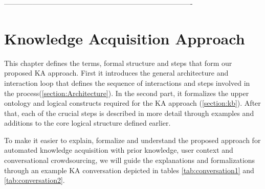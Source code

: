 -------------------------------------------------------------------------------
% 
\chapter{Knowledge Acquisition Approach}
\label{chapter:approach}

This chapter defines the terms, formal structure and steps that form our 
proposed KA approach. First it introduces the general architecture and 
interaction loop that defines the sequence of interactions and steps
involved in the process(\autoref{section:Architecture}). In the second part, it
formalizes the upper ontology and logical constructs required for the KA 
approach (\autoref{section:kb}). After that, each of the crucial steps is 
described in more detail through examples and additions to the core logical 
structure defined earlier.

To make it easier to explain, formalize and understand the proposed approach 
for automated knowledge acquisition with prior knowledge, user context and 
conversational crowdsourcing, we will guide the explanations and formalizations
through an example KA conversation depicted in tables \ref{tab:conversation1}
and \ref{tab:conversation2}.

\newcommand{\step}[1]{\refstepcounter{stepno}\label{#1}}

